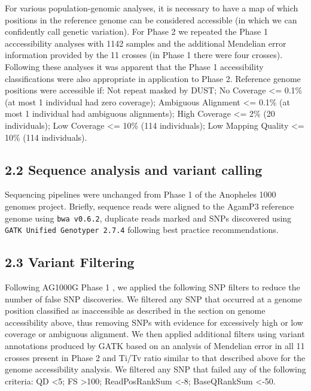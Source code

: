 \documentclass[a4paper,11pt,abstracton,hidelinks]{scrartcl}
\begin{document}
%
For various population-genomic analyses, it is necessary to have a map of which positions in the reference genome can be considered accessible (in which we can confidently call genetic variation).
%
For Phase 2 we repeated the Phase 1 acccessibility analyses \cite{Ag1000gConsortium2017} with 1142 samples and the additional Mendelian error information provided by the 11 crosses (in Phase 1 there were four crosses).
%
Following these analyses it was apparent that the Phase 1 accessibility classifications were also appropriate in application to Phase 2.
%
Reference genome positions were accessible if: 
Not repeat masked by DUST; 
No Coverage <= 0.1\% (at most 1 individual had zero coverage); 
Ambiguous Alignment <= 0.1\% (at most 1 individual had ambiguous alignments); 
High Coverage <= 2\% (20 individuals); 
Low Coverage <= 10\% (114 individuals); 
Low Mapping Quality <= 10\% (114 individuals).

\subsection*{2.2 Sequence analysis and variant calling}
%
Sequencing pipelines were unchanged from Phase 1 of the Anopheles 1000 genomes project\cite{Ag1000gConsortium2017}.
%
Briefly, sequence reads were aligned to the AgamP3 reference genome \cite{sharakhova2007update} using \texttt{bwa v0.6.2}, duplicate reads marked \cite{li2009} and SNPs discovered using \texttt{GATK Unified Genotyper 2.7.4} \cite{van2013} following best practice recommendations. 


\subsection*{2.3 Variant Filtering}
%
Following AG1000G Phase 1 \cite{Ag1000gConsortium2017}, we applied the following SNP filters to reduce the number of false SNP discoveries.
%
We filtered any SNP that occurred at a genome position classified as inaccessible as described in the section on genome accessibility above, thus removing SNPs with evidence for excessively high or low coverage or ambiguous alignment. 
%
We then applied additional filters using variant annotations produced by GATK based on an analysis of Mendelian error in all 11 crosses present in Phase 2 and Ti/Tv ratio similar to that described above for the genome accessibility analysis.
%
We filtered any SNP that failed any of the following criteria: QD <5; FS >100; ReadPosRankSum <-8; BaseQRankSum <-50. 
\end{document}
